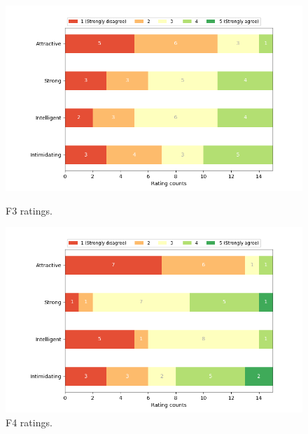 \begin{figure}[H]
  \includegraphics[width=\linewidth]{Survey/FRatings/avatar_f3.png}
  \caption{F3 ratings.}
\endminipage\hfill
{}
  \includegraphics[width=\linewidth]{Survey/FRatings/avatar_f4.png}
  \caption{F4 ratings.}
\endminipage\hfill
\end{figure}
